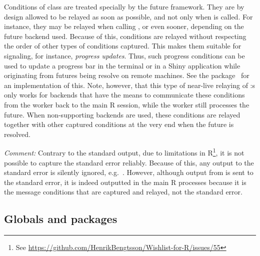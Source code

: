 Conditions of class  are treated specially by
the future framework. They are by design allowed to be relayed as soon
as possible, and not only when  is called. For instance,
they may be relayed when calling , or even sooner,
depending on the future backend used. Because of this,
 conditions are relayed without respecting
the order of other types of conditions captured. This makes them
suitable for signaling, for instance, \emph{progress updates}.  Thus,
such progress conditions can be used to update a progress bar in the
terminal or in a Shiny application while originating from futures
being resolve on remote machines.  See the 
package~\citep{CRAN:progressr} for an implementation of this.  Note,
however, that this type of near-live relaying of
:s only works for backends that have the means to
communicate these conditions from the worker back to the main R
session, while the worker still processes the future.  When
non-supporting backends are used, these conditions are relayed
together with other captured conditions at the very end when the
future is resolved.

\emph{Comment:} Contrary to the standard output, due to limitations in
R\footnote{See \url{https://github.com/HenrikBengtsson/Wishlist-for-R/issues/55}},
it is not possible to capture the standard error reliably.  Because of
this, any output to the standard error is silently ignored,
e.g.\ . However, although
output from  is sent to the standard error, it is
indeed outputted in the main R processes because it is the message
conditions that are captured and relayed, not the standard error.


\subsection{Globals and packages}
\label{global-variables}

